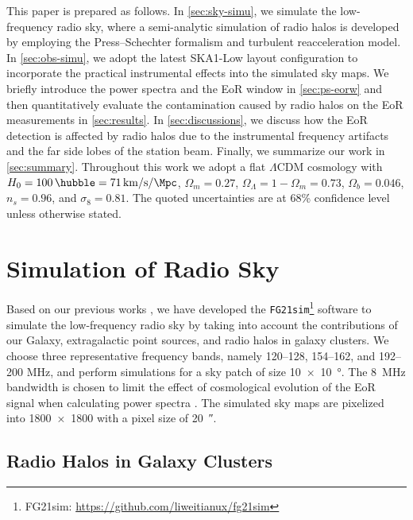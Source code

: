 \documentclass[twocolumn]{aastex62}
\newcommand{\lcdm}{$\Lambda$CDM}
\begin{document}
This paper is prepared as follows.
In \autoref{sec:sky-simu}, we simulate the low-frequency radio sky, where a
semi-analytic simulation of radio halos is developed by employing
the Press--Schechter formalism and turbulent reacceleration model.
In \autoref{sec:obs-simu}, we adopt the latest SKA1-Low layout
configuration to incorporate the practical instrumental effects into
the simulated sky maps.
We briefly introduce the power spectra and the EoR window in
\autoref{sec:ps-eorw}
and then quantitatively evaluate the contamination caused by radio halos
on the EoR measurements in \autoref{sec:results}.
In \autoref{sec:discussions}, we discuss how the EoR detection is
affected by radio halos due to the instrumental frequency artifacts
and the far side lobes of the station beam.
Finally, we summarize our work in \autoref{sec:summary}.
Throughout this work we adopt a flat \lcdm{} cosmology with
$H_0 = \SI{100}{\hubble} = \SI{71}{\km\per\second\per\Mpc}$,
$\Omega_m = 0.27$, $\Omega_{\Lambda} = 1 - \Omega_m = 0.73$,
$\Omega_b = 0.046$, $n_s = 0.96$, and $\sigma_8 = 0.81$.
The quoted uncertainties are at 68\% confidence level unless
otherwise stated.


\section{Simulation of Radio Sky}
\label{sec:sky-simu}

Based on our previous works \citep{wang2010,wang2013}, we have developed
the \texttt{FG21sim}\footnote{%
  FG21sim: \url{https://github.com/liweitianux/fg21sim}}
software to simulate the low-frequency
radio sky by taking into account the contributions of our Galaxy,
extragalactic point sources, and radio halos in galaxy clusters.
We choose three representative frequency bands, namely
\numrange{120}{128}, \numrange{154}{162}, and \numrange{192}{200}
\si{\MHz}, and perform simulations for a sky patch of size
\SI[product-units=repeat]{10 x 10}{\degree}.
The \SI{8}{\MHz} bandwidth is chosen to limit the effect of
cosmological evolution of the EoR signal when calculating power
spectra \citep[e.g.][]{wyithe2004,thyagarajan2013}.
The simulated sky maps are pixelized into \num{1800 x 1800} with a pixel
size of \SI{20}{\arcsecond}.


\subsection{Radio Halos in Galaxy Clusters}
\label{sec:cluster-halos}
\end{document}
